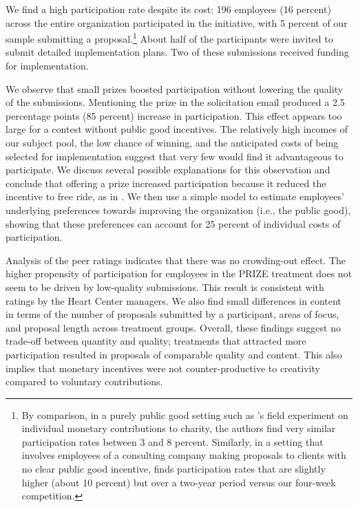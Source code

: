 \documentclass[11pt, titlepage]{article}
\begin{document}
We find a high participation rate despite its cost: 196 employees (16
percent) across the entire organization participated in the initiative,
with 5 percent of our sample submitting a proposal.\footnote{By
  comparison, in a purely public good setting such as
  \citet{list2002effects}'s field experiment on individual monetary
  contributions to charity, the authors find very similar participation
  rates between 3 and 8 percent. Similarly, in a setting that involves
  employees of a consulting company making proposals to clients with no
  clear public good incentive, \citet{gibbs2014field} finds
  participation rates that are slightly higher (about 10 percent) but
  over a two-year period versus our four-week competition.} About half
of the participants were invited to submit detailed implementation
plans. Two of these submissions received funding for implementation.

We observe that small prizes boosted participation without lowering the
quality of the submissions. Mentioning the prize in the solicitation
email produced a 2.5 percentage points (85 percent) increase in
participation. This effect appears too large for a contest without
public good incentives. The relatively high incomes of our subject pool,
the low chance of winning, and the anticipated costs of being selected
for implementation suggest that very few would find it advantageous to
participate. We discuss several possible explanations for this
observation and conclude that offering a prize increased participation
because it reduced the incentive to free ride, as in
\citet{morgan2000financing}. We then use a simple model to estimate
employees' underlying preferences towards improving the organization
(i.e., the public good), showing that these preferences can account for
25 percent of individual costs of participation.

Analysis of the peer ratings indicates that there was no crowding-out
effect. The higher propensity of participation for employees in the
PRIZE treatment does not seem to be driven by low-quality submissions.
This result is consistent with ratings by the Heart Center managers. We
also find small differences in content in terms of the number of
proposals submitted by a participant, areas of focus, and proposal
length across treatment groups. Overall, these findings suggest no
trade-off between quantity and quality; treatments that attracted more
participation resulted in proposals of comparable quality and content.
This also implies that monetary incentives were not counter-productive
to creativity compared to voluntary contributions.
\end{document}
